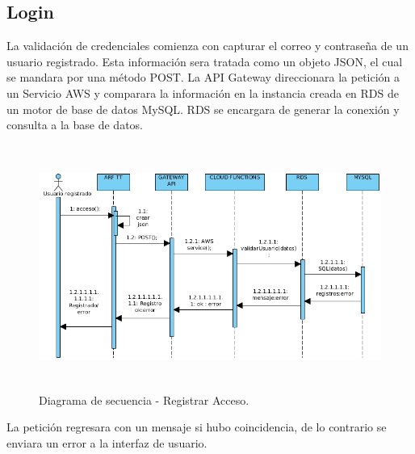 \subsection{Login}
La validación de credenciales comienza con capturar el correo y contraseña  de un usuario registrado. Esta información sera tratada como un objeto JSON, el cual se mandara por una método POST. La API Gateway direccionara la petición a un Servicio AWS y  comparara la información en la instancia creada en RDS de un motor de base de datos MySQL. RDS se encargara de generar la conexión y consulta a la base de datos.
\vspace{5mm}
\begin{figure}[h!]
	\centering
	\includegraphics[width=14cm,height=8cm]{imagenes/analisis/DSacceso.jpg}
	\caption{Diagrama de secuencia - Registrar Acceso.}
	\label{fig:analogo}
\end{figure} 
\vspace{5mm} \par
La petición regresara con un mensaje si hubo coincidencia, de lo contrario se enviara un error a la interfaz de usuario.
\newpage
